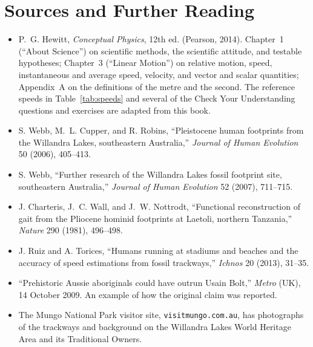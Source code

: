 \documentclass[11pt,twoside,openany]{book}
\begin{document}
\section*{Sources and Further Reading}
\begin{itemize}[itemsep=3pt]
  \item P.~G. Hewitt, \emph{Conceptual Physics}, 12th ed. (Pearson, 2014). Chapter~1 (``About Science'') on scientific methods, the scientific attitude, and testable hypotheses; Chapter~3 (``Linear Motion'') on relative motion, speed, instantaneous and average speed, velocity, and vector and scalar quantities; Appendix~A on the definitions of the metre and the second. The reference speeds in Table~\ref{tab:speeds} and several of the Check Your Understanding questions and exercises are adapted from this book.
  \item S. Webb, M.~L. Cupper, and R. Robins, ``Pleistocene human footprints from the Willandra Lakes, southeastern Australia,'' \emph{Journal of Human Evolution} 50 (2006), 405--413.
  \item S. Webb, ``Further research of the Willandra Lakes fossil footprint site, southeastern Australia,'' \emph{Journal of Human Evolution} 52 (2007), 711--715.
  \item J. Charteris, J.~C. Wall, and J.~W. Nottrodt, ``Functional reconstruction of gait from the Pliocene hominid footprints at Laetoli, northern Tanzania,'' \emph{Nature} 290 (1981), 496--498.
  \item J. Ruiz and A. Torices, ``Humans running at stadiums and beaches and the accuracy of speed estimations from fossil trackways,'' \emph{Ichnos} 20 (2013), 31--35.
  \item ``Prehistoric Aussie aboriginals could have outrun Usain Bolt,'' \emph{Metro} (UK), 14 October 2009. An example of how the original claim was reported.
  \item The Mungo National Park visitor site, \texttt{visitmungo.com.au}, has photographs of the trackways and background on the Willandra Lakes World Heritage Area and its Traditional Owners.
\end{itemize}
\end{document}
